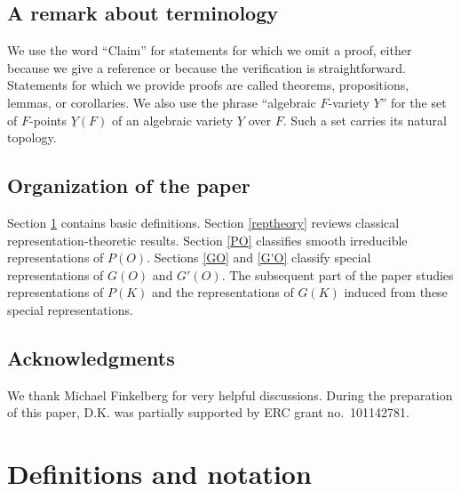 \documentclass[11pt,a4paper,twoside]{amsart}
\theoremstyle{definition}
\theoremstyle{remark}
\newcommand{\un}{\underline}
\begin{document}
\subsection{A remark about terminology}
We use the word ``Claim'' for statements for which we omit a proof, either because we give a reference or because the verification is straightforward. Statements for which we provide proofs are called theorems, propositions, lemmas, or corollaries.
We also use the phrase ``algebraic $F$-variety $Y$'' for the set of $F$-points $\un Y(F)$ of an algebraic variety $\un Y$ over $F$. Such a set carries its natural topology.
\subsection{Organization of the paper}
Section \ref{deff} contains basic definitions. Section \ref{reptheory} reviews classical representation-theoretic results. Section \ref{PO} classifies smooth irreducible representations of $P(O)$. Sections \ref{GO} and \ref{G'O} classify special representations of $G(O)$ and $G'(O)$. The subsequent part of the paper studies representations of $P(K)$ and the representations of $G(K)$ induced from these special representations.
\subsection{Acknowledgments}
We thank Michael Finkelberg for very helpful discussions. During the preparation of this paper, D.K. was partially supported by ERC grant no.~101142781.
\section{Definitions and notation}\label{deff}
\end{document}
